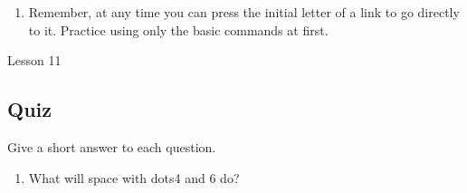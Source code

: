 \documentclass[10pt,letterpaper,twoside]{report}
\begin{document}
{{{{\begin{enumerate}
\begin{enumerate}
\begin{enumerate}
			            \item manage internet files
			                  
			            \item go to the display settings
			                  
			            \item print the current web page
			                  
			            \item check the error status
			                  
			            \item Enter with lower h (dots2 3 6 will go to the history list).
			                  
			            \item Space with dots1 3 will go to the previous input control.  Space with dots4 and 6 will go to the next input control.  Space with dots1 3 4 6 will read the current input control.
			                  
			            \item Space with b will take you to the block commands menu.
			                  
			            \item To access the spelling checker, use space with dots1 6.
			                  
			            \item Space with s will save a file.
		            \end{enumerate}
	      \end{enumerate}
	\item Remember, at any time you can press the initial letter of a link to go directly to it.  Practice using only the basic commands at first.
\end{enumerate}





\clearpage

\newpage
Lesson 11

\subsection{Quiz}



Give a short answer to each question.



\begin{enumerate}
	\item What will space with dots4 and 6 do?
	      

\end{enumerate}}}}}
\end{document}
